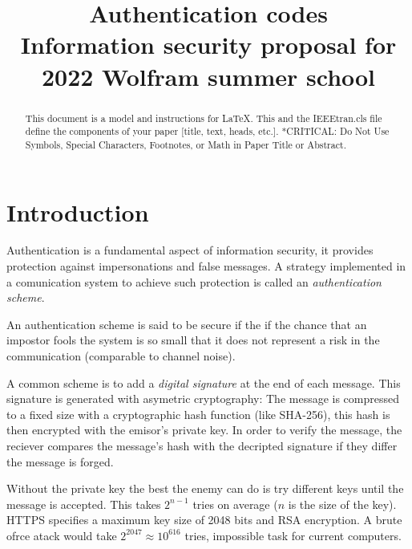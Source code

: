 \documentclass[conference]{IEEEtran}
\begin{document}
\title{
Authentication codes  \\
{\footnotesize Information security proposal for 2022 Wolfram summer school}
}

\author{
}

\maketitle

\begin{abstract}
    This document is a model and instructions for \LaTeX.
    This and the IEEEtran.cls file define the components of your paper [title, text, heads, etc.]. *CRITICAL: Do Not Use Symbols, Special Characters, Footnotes,
    or Math in Paper Title or Abstract.
\end{abstract}


%
%
\section{Introduction}
Authentication is a fundamental aspect of information security, it provides protection against impersonations and false messages. A strategy implemented in a comunication system to achieve such protection is called an \textit{authentication scheme}.

An authentication scheme is said to be secure if the if the chance that an impostor fools the system is so small that it does not represent a risk in the communication (comparable to channel noise).

A common scheme is to add a \textit{digital signature} at the end of each message. This signature is generated with asymetric cryptography: The message is compressed to a fixed size with a cryptographic hash function (like SHA-256), this hash is then encrypted with the emisor's private key. In order to verify the message, the reciever compares the message's hash with the decripted signature if they differ the message is forged.

Without the private key the best the enemy can do is try different keys until the message is accepted. This takes $2^{n-1}$ tries on average ($n$ is the size of the key). HTTPS specifies a maximum key size of 2048 bits and RSA encryption. A brute ofrce atack would take $2^{2047} \approx 10^{616}$ tries, impossible task for current computers.
\end{document}
